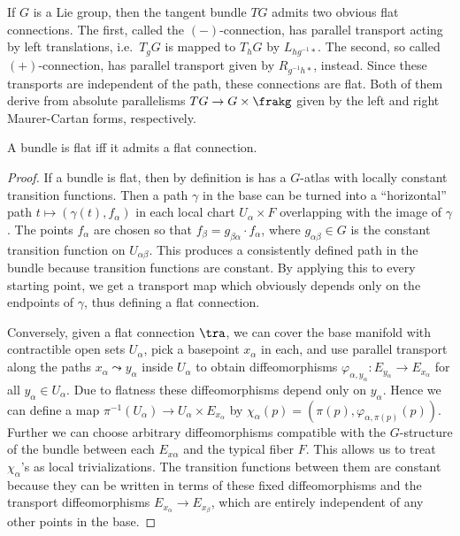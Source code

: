\begin{example}\label{ex flat connections on G}
    If $G$ is a Lie group, then the tangent bundle $TG$ admits two obvious flat connections. The first, called the $(-)$-connection, has parallel transport acting by left translations, i.e.\ $T_g G$ is mapped to $T_h G$ by $L_{hg^{-1}\ast}$. The second, so called $(+)$-connection, has parallel transport given by $R_{g^{-1}h\ast}$, instead. Since these transports are independent of the path, these connections are flat. Both of them derive from absolute parallelisms $TG\to G\times\frakg$ given by the left and right Maurer-Cartan forms, respectively.
\end{example}



\begin{prop}
    A bundle is flat iff it admits a flat connection.
\end{prop}
\begin{proof}
    If a bundle is flat, then by definition is has a $G$-atlas with locally constant transition functions. Then a path $\gamma$ in the base can be turned into a ``horizontal'' path $t\mapsto (\gamma(t),f_\alpha)$ in each local chart $U_\alpha\times F$ overlapping with the image of $\gamma$. The points $f_\alpha$ are chosen so that $f_\beta=g_{\beta\alpha}\cdot f_\alpha$, where $g_{\alpha\beta}\in G$ is the constant transition function on $U_{\alpha\beta}$. This produces a consistently defined path in the bundle because transition functions are constant. By applying this to every starting point, we get a transport map which obviously depends only on the endpoints of $\gamma$, thus defining a flat connection.

    Conversely, given a flat connection $\tra$, we can cover the base manifold with contractible open sets $U_\alpha$, pick a basepoint $x_\alpha$ in each, and use parallel transport along the paths $x_\alpha\leadsto y_\alpha$ inside $U_\alpha$ to obtain diffeomorphisms $\varphi_{\alpha,y_\alpha}:E_{y_\alpha}\to E_{x_\alpha}$ for all $y_\alpha\in U_\alpha$. Due to flatness these diffeomorphisms depend only on $y_\alpha$. Hence we can define a map $\pi^{-1}(U_\alpha)\to U_\alpha\times E_{x_\alpha}$ by $\chi_\alpha(p)=(\pi(p),\varphi_{\alpha,\pi(p)}(p))$. Further we can choose arbitrary diffeomorphisms compatible with the $G$-structure of the bundle between each $E_{x\alpha}$ and the typical fiber $F$. This allows us to treat $\chi_\alpha$'s as local trivializations. The transition functions between them are constant because they can be written in terms of these fixed diffeomorphisms and the transport diffeomorphisms $E_{x_\alpha}\to E_{x_\beta}$, which are entirely independent of any other points in the base.
\end{proof}

